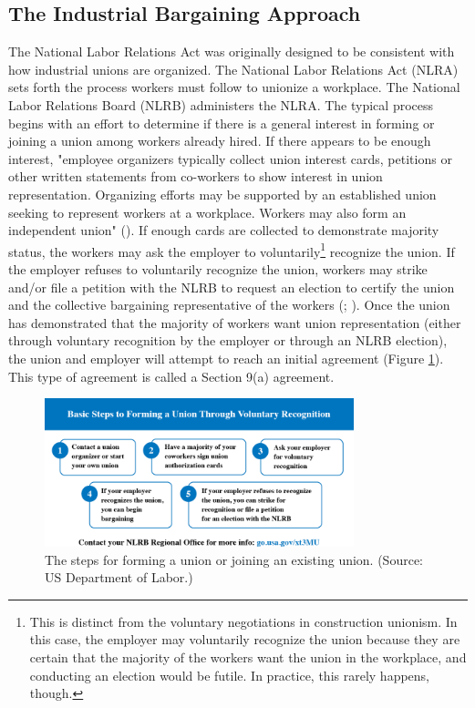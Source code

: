\documentclass[12pt]{article}
\newcommand{\imageWidth}{0.8\textwidth}
\begin{document}
\subsection{The Industrial Bargaining Approach}

The National Labor Relations Act was originally designed to be consistent with how industrial unions are organized. The National Labor Relations Act (NLRA) sets forth the process workers must follow to unionize a workplace. The National Labor Relations Board (NLRB) administers the NLRA. The typical process begins with an effort to determine if there is a general interest in forming or joining a union among workers already hired. If there appears to be enough interest, "employee organizers typically collect union interest cards, petitions or other written statements from co-workers to show interest in union representation. Organizing efforts may be supported by an established union seeking to represent workers at a workplace. Workers may also form an independent union" (\cite["How can I form a union?"]{dolWORKCenterUnions}). If enough cards are collected to demonstrate majority status, the workers may ask the employer to voluntarily\footnote{This is distinct from the voluntary negotiations in construction unionism. In this case, the employer may voluntarily recognize the union because they are certain that the majority of the workers want the union in the workplace, and conducting an election would be futile. In practice, this rarely happens, though.}  recognize the union. If the employer refuses to voluntarily recognize the union, workers may strike and/or file a petition with the NLRB to request an election to certify the union and the collective bargaining representative of the workers (\cite["How can I form a union?"]{dolWORKCenterUnions}; \cite{nlrbNLRBProcess}). Once the union has demonstrated that the majority of workers want union representation (either through voluntary recognition by the employer or through an NLRB election), the union and employer will attempt to reach an initial agreement (Figure \ref{fig:DOL}). This type of agreement is called a Section 9(a) agreement.

\begin{figure}[ht]
  \centering
  \includegraphics[width=\imageWidth]{images/DOL}
  \captionsetup{justification=centering, singlelinecheck=false, margin=2cm}
  \caption[Forming a Union]{The steps for forming a union or joining an existing union. (Source: US Department of Labor.)}
  \label{fig:DOL}
\end{figure}
\end{document}
